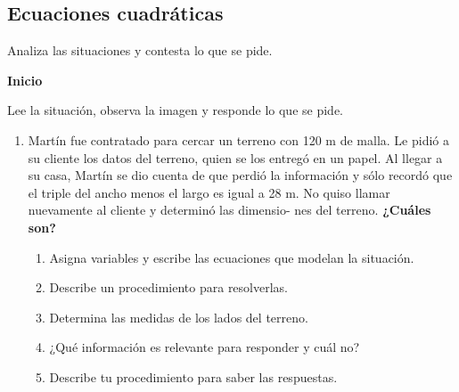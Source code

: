 \documentclass[11pt]{book}
\begin{document}
\subsection{Ecuaciones cuadráticas}

Analiza las situaciones y contesta lo que se pide.\\

\begin{boxK}
    \begin{center}\textbf{Inicio}\end{center}
    Lee la situación, observa la imagen y responde lo que se pide.
    \begin{enumerate}
        \item Martín fue contratado para cercar un terreno con 120 m de malla. Le pidió a su cliente
              los datos del terreno, quien se los entregó en un papel. Al llegar a su casa, Martín se dio
              cuenta de que perdió la información y sólo recordó que el triple del ancho menos el
              largo es igual a 28 m. No quiso llamar nuevamente al cliente y determinó las dimensio-
              nes del terreno. \textbf{¿Cuáles son?}
              \begin{enumerate}
                  \item Asigna variables y escribe las ecuaciones que modelan la situación.
                  \item Describe un procedimiento para resolverlas.
                  \item Determina las medidas de los lados del terreno.
                  \item ¿Qué información es relevante para responder y
                        cuál no?
                  \item Describe tu procedimiento para saber las respuestas.
              \end{enumerate}
    \end{enumerate}

\end{boxK}
\end{document}
